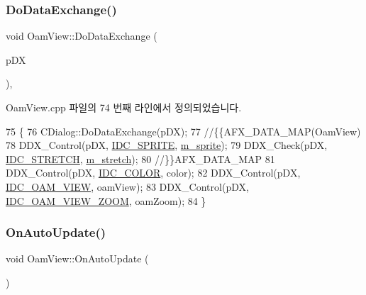 \subsubsection{\texorpdfstring{Do\+Data\+Exchange()}{DoDataExchange()}}
{\footnotesize\ttfamily void Oam\+View\+::\+Do\+Data\+Exchange (\begin{DoxyParamCaption}\item[{C\+Data\+Exchange $\ast$}]{p\+DX }\end{DoxyParamCaption})\hspace{0.3cm}{\ttfamily [protected]}, {\ttfamily [virtual]}}



Oam\+View.\+cpp 파일의 74 번째 라인에서 정의되었습니다.


\begin{DoxyCode}
75 \{
76   CDialog::DoDataExchange(pDX);
77   \textcolor{comment}{//\{\{AFX\_DATA\_MAP(OamView)}
78   DDX\_Control(pDX, \mbox{\hyperlink{resource_8h_a39ea4aab0d21552e54f688ffae515f40}{IDC\_SPRITE}}, \mbox{\hyperlink{class_oam_view_a808b936a1493d14a2a4bf27f3030af14}{m\_sprite}});
79   DDX\_Check(pDX, \mbox{\hyperlink{resource_8h_a639d2318d8892c6f42b323500aae50f0}{IDC\_STRETCH}}, \mbox{\hyperlink{class_oam_view_a0eeb8a1eeda8d53816c2696d70d61da4}{m\_stretch}});
80   \textcolor{comment}{//\}\}AFX\_DATA\_MAP}
81   DDX\_Control(pDX, \mbox{\hyperlink{resource_8h_a611975b03b6d7ce68b2de260b97086d0}{IDC\_COLOR}}, color);
82   DDX\_Control(pDX, \mbox{\hyperlink{resource_8h_a9b64c0912aa96e257bf909982c83e5ab}{IDC\_OAM\_VIEW}}, oamView);
83   DDX\_Control(pDX, \mbox{\hyperlink{resource_8h_a7e646a067717f74b563429c8b81c7df2}{IDC\_OAM\_VIEW\_ZOOM}}, oamZoom);
84 \}
\end{DoxyCode}
\mbox{\label{class_oam_view_a5c3407e6ff2ffc673ea913d19883a4c8}} 
\subsubsection{\texorpdfstring{On\+Auto\+Update()}{OnAutoUpdate()}}
{\footnotesize\ttfamily void Oam\+View\+::\+On\+Auto\+Update (\begin{DoxyParamCaption}{ }\end{DoxyParamCaption})\hspace{0.3cm}{\ttfamily [protected]}}



